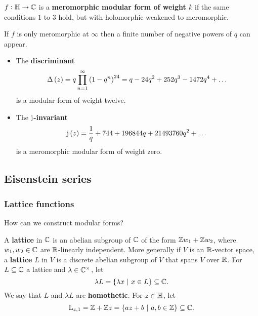 \begin{definition}
$ f : \mathbb{H} \to \mathbb{C} $ is a \textbf{meromorphic modular form of weight $ k $} if the same conditions $ 1 $ to $ 3 $ hold, but with holomorphic weakened to meromorphic.
\end{definition}

\begin{note*}
If $ f $ is only meromorphic at $ \infty $ then a finite number of negative powers of $ q $ can appear.
\end{note*}

\begin{example*}
\hfill
\begin{itemize}
\item The \textbf{discriminant}
$$ \Delta\br{z} = q\prod_{n = 1}^\infty \br{1 - q^n}^{24} = q - 24q^2 + 252q^3 - 1472q^4 + \dots $$
is a modular form of weight twelve.
\item The \textbf{$ \mathrm{j} $-invariant}
$$ \j\br{z} = \dfrac{1}{q} + 744 + 196844q + 21493760q^2 + \dots $$
is a meromorphic modular form of weight zero.
\end{itemize}
\end{example*}

\pagebreak

\subsection{Eisenstein series}

\subsubsection{Lattice functions}

How can we construct modular forms?

\begin{definition}
A \textbf{lattice} in $ \mathbb{C} $ is an abelian subgroup of $ \mathbb{C} $ of the form $ \mathbb{Z} w_1 + \mathbb{Z} w_2 $, where $ w_1, w_2 \in \mathbb{C} $ are $ \mathbb{R} $-linearly independent. More generally if $ V $ is an $ \mathbb{R} $-vector space, a \textbf{lattice} $ L $ in $ V $ is a discrete abelian subgroup of $ V $ that spans $ V $ over $ \mathbb{R} $. For $ L \subseteq \mathbb{C} $ a lattice and $ \lambda \in \mathbb{C}^\times $, let
$$ \lambda L = \cbr{\lambda x \st x \in L} \subseteq \CC. $$
We say that $ L $ and $ \lambda L $ are \textbf{homothetic}. For $ z \in \mathbb{H} $, let
$$ \L_{z, 1} = \ZZ + \ZZ z = \cbr{az + b \st a, b \in \ZZ} \subseteq \CC. $$
\end{definition}

